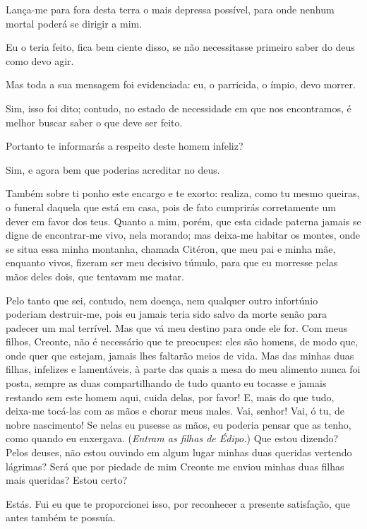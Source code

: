    Lança-me para fora desta terra o mais depressa possível, para onde
nenhum mortal poderá se dirigir a mim.

   Eu o teria feito, fica bem ciente disso, se não necessitasse primeiro
saber do deus como devo agir.

   Mas toda a sua mensagem foi evidenciada: eu, o parricida, o
ímpio, devo morrer.

   Sim, isso foi dito; contudo, no estado de necessidade em que nos
encontramos, é melhor buscar saber o que deve ser feito.

   Portanto te informarás a respeito deste homem infeliz?

   Sim, e agora bem que poderias acreditar no deus.

   Também sobre ti ponho este encargo e te exorto: realiza, como tu mesmo
queiras, o funeral daquela que está em casa, pois de fato cumprirás
corretamente um dever em favor dos teus. Quanto a mim, porém, que esta
cidade paterna jamais se digne de encontrar-me vivo, nela
morando; mas deixa-me habitar os montes, onde se situa essa minha
montanha, chamada Citéron, que meu pai e minha mãe, enquanto vivos,
fizeram ser meu decisivo túmulo, para que eu morresse pelas mãos deles
dois, que tentavam me matar.

Pelo tanto que sei, contudo, nem doença, nem qualquer outro infortúnio
poderiam destruir-me, pois eu jamais teria sido salvo da morte senão
para padecer um mal terrível. Mas que vá meu destino para onde ele for.
Com meus filhos, Creonte, não é necessário que te preocupes: eles
são homens, de modo que, onde quer que estejam, jamais lhes faltarão
meios de vida. Mas das minhas duas filhas, infelizes e lamentáveis, à
parte das quais a mesa do meu alimento nunca foi posta, sempre as duas
compartilhando de tudo quanto eu tocasse e jamais restando sem este
homem aqui, cuida delas, por favor! E, mais do que tudo, deixa-me
tocá-las com as mãos e chorar meus males. Vai, senhor! Vai, ó tu, de
nobre nascimento! Se nelas eu pusesse as mãos, eu poderia pensar
que as tenho, como quando eu enxergava. (\emph{Entram as filhas de
Édipo.}) Que estou dizendo? Pelos deuses, não estou ouvindo em algum
lugar minhas duas queridas vertendo lágrimas? Será que por piedade de
mim Creonte me enviou minhas duas filhas mais queridas? Estou certo?

   Estás. Fui eu que te proporcionei isso, por reconhecer a presente
satisfação, que antes também te possuía.

